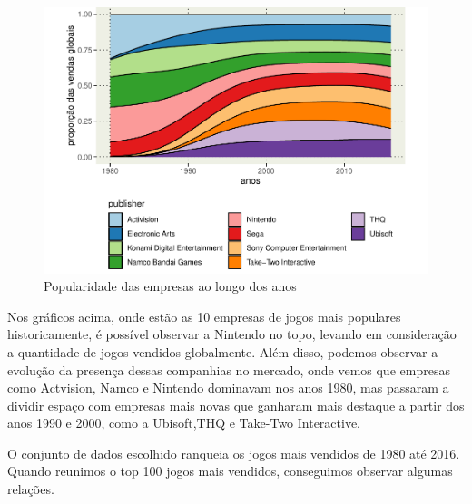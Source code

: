 \documentclass[draft]{agujournal2018}
\begin{document}
\newpage

\begin{figure}[h]
\includegraphics{vendas_de_jogos_de_videogames_files/figure-latex/unnamed-chunk-8-1} \caption{Popularidade das empresas ao longo dos anos}\label{fig:unnamed-chunk-8}
\end{figure}

Nos gráficos acima, onde estão as 10 empresas de jogos mais populares
historicamente, é possível observar a Nintendo no topo, levando em
consideração a quantidade de jogos vendidos globalmente. Além disso,
podemos observar a evolução da presença dessas companhias no mercado,
onde vemos que empresas como Actvision, Namco e Nintendo dominavam nos
anos 1980, mas passaram a dividir espaço com empresas mais novas que
ganharam mais destaque a partir dos anos 1990 e 2000, como a Ubisoft,THQ
e Take-Two Interactive.

\newpage

O conjunto de dados escolhido ranqueia os jogos mais vendidos de 1980
até 2016. Quando reunimos o top 100 jogos mais vendidos, conseguimos
observar algumas relações.
\end{document}

